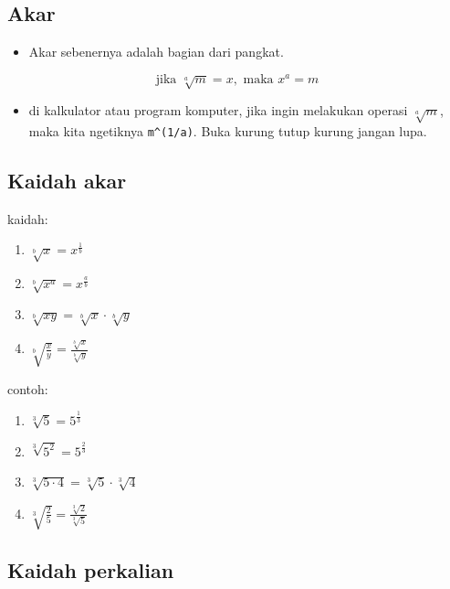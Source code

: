 \documentclass[
  letterpaper,
  DIV=11,
  numbers=noendperiod]{scrartcl}
\providecommand{\tightlist}{%
  \setlength{\itemsep}{0pt}\setlength{\parskip}{0pt}}\usepackage{longtable,booktabs,array}
\begin{document}
\hypertarget{akar}{%
\subsection{Akar}\label{akar}}

\begin{itemize}
\tightlist
\item
  Akar sebenernya adalah bagian dari pangkat.
\end{itemize}

\[
\text {jika } \sqrt[a]{m}=x, \text{ maka } x^a=m
\]

\begin{itemize}
\tightlist
\item
  di kalkulator atau program komputer, jika ingin melakukan operasi
  \(\sqrt[a]{m}\), maka kita ngetiknya \texttt{m\^{}(1/a)}. Buka kurung
  tutup kurung jangan lupa.
\end{itemize}

\hypertarget{kaidah-akar}{%
\subsection{Kaidah akar}\label{kaidah-akar}}

kaidah:

\begin{enumerate}
\def\labelenumi{\arabic{enumi}.}
\tightlist
\item
  \(\sqrt[b]{x}=x^{\frac{1}{b}}\)
\item
  \(\sqrt[b]{x^a}=x^{\frac{a}{b}}\)
\item
  \(\sqrt[b]{xy}=\sqrt[b]{x} \cdot \sqrt[b]{y}\)
\item
  \(\sqrt[b]{\frac{x}{y}}=\frac{\sqrt[b]{x}}{\sqrt[b]{y}}\)
\end{enumerate}

contoh:

\begin{enumerate}
\def\labelenumi{\arabic{enumi}.}
\tightlist
\item
  \(\sqrt[3]{5}=5^{\frac{1}{3}}\)
\item
  \(\sqrt[3]{5^2}=5^{\frac{2}{3}}\)
\item
  \(\sqrt[3]{5 \cdot 4}=\sqrt[3]{5} \cdot \sqrt[3]{4}\)
\item
  \(\sqrt[3]{\frac{2}{5}}=\frac{\sqrt[3]{2}}{\sqrt[3]{5}}\)
\end{enumerate}

\hypertarget{kaidah-perkalian}{%
\subsection{Kaidah perkalian}\label{kaidah-perkalian}}
\end{document}
